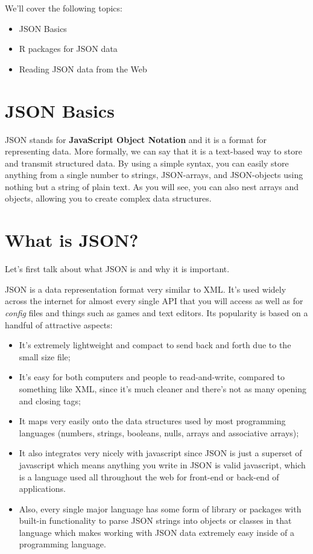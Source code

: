 \documentclass[
]{book}
\providecommand{\tightlist}{%
  \setlength{\itemsep}{0pt}\setlength{\parskip}{0pt}}
\begin{document}
We'll cover the following topics:

\begin{itemize}
\tightlist
\item
  JSON Basics
\item
  R packages for JSON data
\item
  Reading JSON data from the Web
\end{itemize}

\hypertarget{json-basics}{%
\section{JSON Basics}\label{json-basics}}

JSON stands for \textbf{JavaScript Object Notation} and it is a format for
representing data. More formally, we can say that it is a text-based way to
store and transmit structured data. By using a simple syntax, you can easily
store anything from a single number to strings, JSON-arrays, and JSON-objects
using nothing but a string of plain text. As you will see, you can also nest
arrays and objects, allowing you to create complex data structures.

\hypertarget{what-is-json}{%
\section{What is JSON?}\label{what-is-json}}

Let's first talk about what JSON is and why it is important.

JSON is a data representation format very similar to XML. It's used widely
across the internet for almost every single API that you will access as well as
for \emph{config} files and things such as games and text editors. Its popularity
is based on a handful of attractive aspects:

\begin{itemize}
\item
  It's extremely lightweight and compact to send back and forth due to the small
  size file;
\item
  It's easy for both computers and people to read-and-write, compared to
  something like XML, since it's much cleaner and there's not as many opening and
  closing tags;
\item
  It maps very easily onto the data structures used by most programming
  languages (numbers, strings, booleans, nulls, arrays and associative arrays);
\item
  It also integrates very nicely with
  javascript
  since JSON is just a superset of
  javascript
  which means anything you write in JSON is valid javascript, which is a language
  used all throughout the web for front-end or back-end of applications.
\item
  Also, every single major language has some form of library or packages with
  built-in functionality to parse JSON strings into objects or classes in that
  language which makes working with JSON data extremely easy inside of a
  programming language.
\end{itemize}
\end{document}
